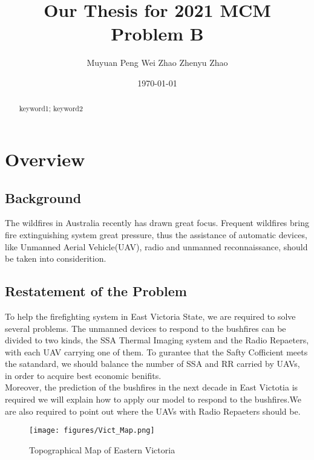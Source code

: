 \documentclass{mcmthesis}
\title{Our Thesis for 2021 MCM Problem B}
\author{Muyuan Peng \quad Wei Zhao \quad Zhenyu Zhao}
\date{\today}
\begin{document}
\begin{abstract}
 

\begin{keywords}
keyword1; keyword2
\end{keywords}
\end{abstract}
\maketitle
\tableofcontents
\newpage
\section{Overview}
\subsection{Background}


 The wildfires in Australia recently has drawn great focus. Frequent wildfires bring fire extinguishing system great pressure, thus the assistance
of automatic devices, like Unmanned Aerial Vehicle(UAV), 
radio and unmanned reconnaissance, should be taken into considerition. 
\subsection{Restatement of the Problem}

To help the firefighting system in East Victoria State, we are required
to solve several problems. The unmanned devices to respond to the bushfires can be divided to two kinds,
the SSA Thermal Imaging system and the Radio Repaeters, with each UAV carrying
one of them. To gurantee that the Safty Cofficient meets the satandard, we should
balance the number of SSA and RR carried by UAVs, in order to acquire best economic benifits.\\
Moreover, the prediction of the bushfires in the next decade in East Victotia is required
we will explain how to apply our model to respond to the bushfires.We are also required 
to point out where the UAVs with Radio Repaeters should be.

\begin{figure}[htbp]
  \centering
  \texttt{[image: figures/Vict\_Map.png]}
  \caption{Topographical Map of Eastern Victoria}
  \label{Topographical Map of Eastern Victoria}
\end{figure}
\end{document}
